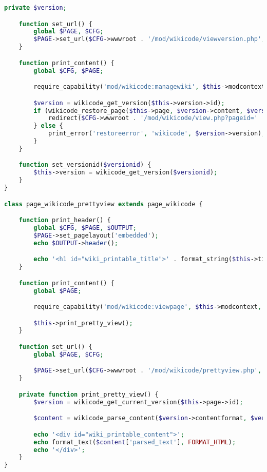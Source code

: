 \begin{lstlisting}[language=PHP]
    private $version;

    function set_url() {
        global $PAGE, $CFG;
        $PAGE->set_url($CFG->wwwroot . '/mod/wikicode/viewversion.php', array('pageid' => $this->page->id, 'versionid' => $this->version->id));
    }

    function print_content() {
        global $CFG, $PAGE;

        require_capability('mod/wikicode:managewiki', $this->modcontext, NULL, true, 'nomanagewikipermission', 'wikicode');

        $version = wikicode_get_version($this->version->id);
        if (wikicode_restore_page($this->page, $version->content, $version->userid)) {
            redirect($CFG->wwwroot . '/mod/wikicode/view.php?pageid=' . $this->page->id, get_string('restoring', 'wikicode', $version->version), 3);
        } else {
            print_error('restoreerror', 'wikicode', $version->version);
        }
    }

    function set_versionid($versionid) {
        $this->version = wikicode_get_version($versionid);
    }
}

class page_wikicode_prettyview extends page_wikicode {

    function print_header() {
        global $CFG, $PAGE, $OUTPUT;
        $PAGE->set_pagelayout('embedded');
        echo $OUTPUT->header();

        echo '<h1 id="wiki_printable_title">' . format_string($this->title) . '</h1>';
    }

    function print_content() {
        global $PAGE;

        require_capability('mod/wikicode:viewpage', $this->modcontext, NULL, true, 'noviewpagepermission', 'wikicode');

        $this->print_pretty_view();
    }

    function set_url() {
        global $PAGE, $CFG;

        $PAGE->set_url($CFG->wwwroot . '/mod/wikicode/prettyview.php', array('pageid' => $this->page->id));
    }

    private function print_pretty_view() {
        $version = wikicode_get_current_version($this->page->id);

        $content = wikicode_parse_content($version->contentformat, $version->content, array('printable' => true, 'swid' => $this->subwiki->id, 'pageid' => $this->page->id, 'pretty_print' => true));

        echo '<div id="wiki_printable_content">';
        echo format_text($content['parsed_text'], FORMAT_HTML);
        echo '</div>';
    }
}


\end{lstlisting}
